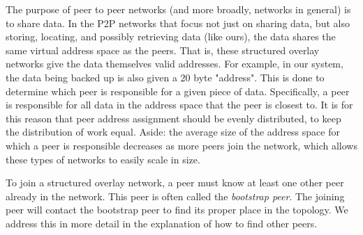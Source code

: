 \documentclass[12pt]{report}
\begin{document}
The purpose of peer to peer networks (and more broadly, networks in general) is to share data. In the P2P networks that focus not just on sharing data, but also storing, locating, and possibly retrieving data (like ours), the data shares the same virtual address space as the peers. That is, these structured overlay networks give the data themselves valid addresses. For example, in our system, the data being backed up is also given a 20 byte "address". This is done to determine which peer is responsible for a given piece of data. Specifically, a peer is responsible for all data in the address space that the peer is closest to. It is for this reason that peer address assignment should be evenly distributed, to keep the distribution of work equal. Aside: the average size of the address space for which a peer is responsible decreases as more peers join the network, which allows these types of networks to easily scale in size.

To join a structured overlay network, a peer must know at least one other peer already in the network. This peer is often called the \textit{bootstrap peer}. The joining peer will contact the bootstrap peer to find its proper place in the topology. We address this in more detail in the explanation of how to find other peers.

\end{document}
